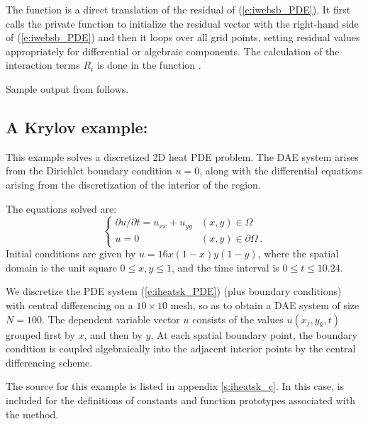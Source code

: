 The function  is a direct translation of the residual of (\ref{e:iwebsb_PDE}).
It first calls the private function  to initialize the residual vector
with the right-hand side of (\ref{e:iwebsb_PDE}) and then
it loops over all grid points, setting residual values appropriately for 
differential or algebraic components. The calculation of the interaction terms
$R_i$ is done in the function .


Sample output from  follows.


\subsection{A Krylov example: }\label{ss:iheatsk}

This example solves a discretized 2D heat PDE problem. The DAE system
arises from the Dirichlet boundary condition $u = 0$, along with the 
differential equations arising from the discretization of the interior 
of the region. 

The equations solved are:
\begin{equation}\label{e:iheatsk_PDE}
\begin{cases}
  \partial u / \partial t = u_{xx} + u_{yy}  & (x,y) \in \Omega \\
  u = 0 & (x,y) \in \partial\Omega\, .
\end{cases}
\end{equation}
Initial conditions are given by $u = 16x(1-x)y(1-y)$, where the spatial domain
is the unit square $0 \leq x,y \leq 1$, and the time interval is 
$0 \leq t \leq 10.24$.

We discretize the PDE system (\ref{e:iheatsk_PDE}) (plus boundary conditions)
with central differencing on a $10 \times 10$ mesh, so as to obtain a
DAE system of size $N = 100$.  The dependent variable vector $u$
consists of the values $u(x_j,y_k,t)$ grouped first by $x$, and then
by $y$.  At each spatial boundary point, the boundary condition is coupled
algebraically into the adjacent interior points by the central differencing
scheme. 

The source for this example is listed in appendix \ref{s:iheatsk_c}.
In this case,  is included for the definitions of
constants and function prototypes associated with the {\spgmr} method.


